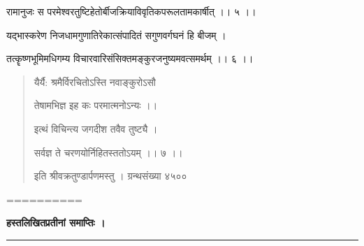 \documentclass[11pt, openany]{book}
\begin{document}
\begin{sloppypar}
\hangindent=0.2in \hspace{0.2in}रामानुजः स परमेश्वरतुष्टिहेतोर्बीजक्रियाविवृतिकपरूलतामकार्षीत् ।। ५ ।। 

\hangindent=0.2in \hspace{0.2in}यद्भास्करेण निजधामगुणातिरेकात्संपादितं सगुणवर्गघनं हि बीजम् । 

\hangindent=0.2in \hspace{0.2in}तत्कॄष्णभूमिमधिगम्य विचारवारिसंसिक्तमङ्कुरजनुष्यमवत्समर्थम् ।। ६ ।। 

\begin{quote}
\hangindent=0.2in \hspace{1in}यैर्यै: श्रमैर्विरचितोऽस्ति नवाङ्कुरोऽसौ 

\hangindent=0.2in \hspace{1in}तेषामभिज्ञ इह कः परमात्मनोऽन्यः ।। 

\hangindent=0.2in \hspace{1in}इत्थं विचिन्त्य जगदीश तवैव तुष्ट्यै । 

\hangindent=0.2in \hspace{1in}सर्वज्ञ ते चरणयोर्निहितस्ततोऽयम् ।। ७ ।। 

\hangindent=0.2in \hspace{1in}इति श्रीवक्रतुण्डार्पणमस्तु । ग्रन्थसंख्या ४५०० \textbar
\end{quote}

\begin{center}
 ==========
\end{center}
\end{sloppypar}
\thispagestyle{empty}
\newpage

\onehalfspacing
\begin{center}
    \textbf{\large हस्तलिखितप्रतीनां समाप्तिः ।}
    
    \rule{0.3\linewidth}{0.5pt}
\end{center}
\end{document}
